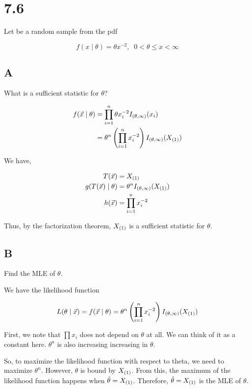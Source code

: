 \section*{7.6}

Let \rs be a random sample from the pdf

\[f(x \mid \theta) = \theta x^{-2}, \;\; 0 < \theta \leq x < \infty\]

\subsection*{A}

What is a sufficient statistic for $\theta$?

\begin{align*}
	f(\vec{x} \mid \theta) &= \prod_{i=1}^n \theta x_i^{-2} I_{(\theta, \infty)}(x_i) \\
	&= \theta^n \left( \prod_{i=1}^n x_i^{-2} \right) I_{(\theta, \infty)}(X_{(1)})
\end{align*}

We have,

\begin{align*}
	T(\vec{x}) &= X_{(1)} \\
	g(T(\vec{x}) \mid \theta) &= \theta^n I_{(\theta, \infty)}(X_{(1)}) \\
	h(\vec{x}) &= \prod_{i=1}^n x_i^{-2}
\end{align*}

Thus, by the factorization theorem, $X_{(1)}$ is a sufficient statistic for $\theta$.

\subsection*{B}

Find the MLE of $\theta$.

We have the likelihood function

\[
	L(\theta \mid \vec{x}) = f(\vec{x} \mid \theta) = \theta^n \left( \prod_{i=1}^n x_i^{-2} \right) I_{(\theta, \infty)}(X_{(1)})
\]

First, we note that $\prod x_i$ does not depend on $\theta$ at all. We can think of it as a constant here. $\theta^n$ is also increasing increasing in $\theta$. 

So, to maximize the likelihood function with respect to theta, we need to maximize $\theta^n$. However, $\theta$ is bound by $X_{(1)}$. From this, the maximum of the likelihood function happens when $\hat{\theta} = X_{(1)}$. Therefore, $\hat{\theta} = X_{(1)}$ is the MLE of $\theta$. 

